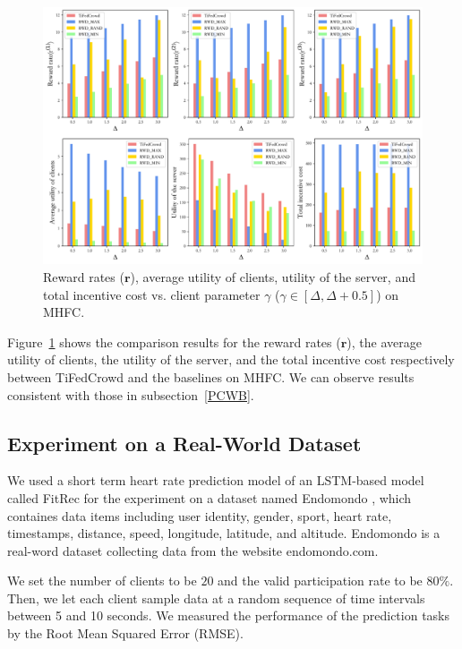 \documentclass[final,1p,times]{elsarticle}
\begin{document}
\begin{figure}
	\centering
	\centerline{\includegraphics[width=5.5in]{fig5.pdf}}
	\caption{Reward rates ($\bm{r}$), average utility of clients, utility of the server, and total incentive cost vs. client parameter $\gamma$ ($\gamma\in[\Delta,\Delta+0.5]$) on MHFC.}
	\label{fig:5}
\end{figure}

Figure~\ref{fig:5} shows the comparison results for the reward rates ($\bm{r}$), the average utility of clients, the utility of the server, and the total incentive cost respectively between TiFedCrowd and the baselines on MHFC. We can observe results consistent with those in  subsection~\ref{PCWB}. 

\subsection{Experiment on a Real-World Dataset} \label{ERCP}
We used a short term heart rate prediction model of an LSTM-based model called FitRec \citep{ni2019modeling} for the experiment on a dataset named Endomondo \citep{ni2019modeling}, which containes data items including user identity, gender, sport, heart rate, timestamps, distance, speed, longitude, latitude, and altitude. Endomondo is a real-word dataset collecting data from the website endomondo.com. 

We set the number of clients to be $20$ and the valid participation rate to be $80\%$. Then, we let each client sample data at a random sequence of time intervals between 5 and 10 seconds. We measured the performance of the prediction tasks by the Root Mean Squared Error (RMSE).
\end{document}
